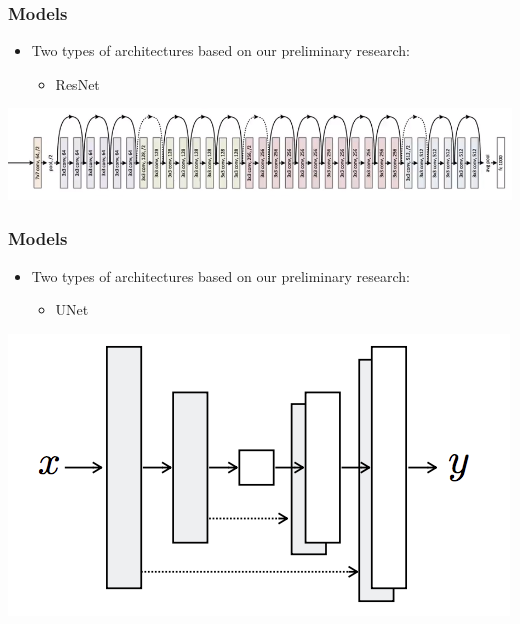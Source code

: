 \documentclass[18pt]{beamer}
\begin{document}
\begin{frame}[t]
  \frametitle{Models}
  \begin{itemize}
  \item Two types of architectures based on our preliminary research:
    \begin{itemize}
    \item ResNet 
    \end{itemize}
  \end{itemize}

  \vspace{1cm}
  \begin{center}
      \includegraphics[scale=0.37]{images/nets/res}
    \end{center}
\end{frame}


\begin{frame}[t]
  \frametitle{Models}
  \begin{itemize}
  \item Two types of architectures based on our preliminary research:
    \begin{itemize}
    \item UNet
    \end{itemize}
  \end{itemize}

  \vspace{1cm}
  \begin{center}
    \includegraphics[scale=0.37]{images/nets/unet}
  \end{center}
  
\end{frame}
\end{document}
